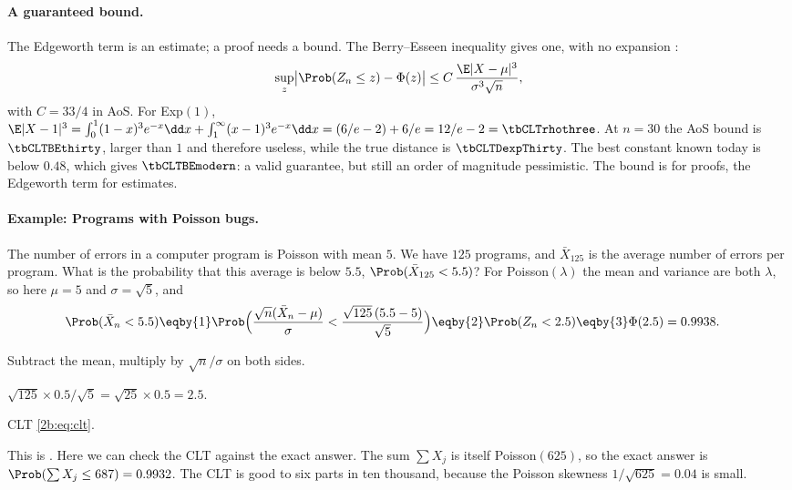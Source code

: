 \paragraph{A guaranteed bound.} The Edgeworth term is an estimate; a proof needs a bound. The Berry--Esseen inequality gives one, with no expansion :
\begin{equation}
  \sup_z\bigl|\Prob(Z_n\le z)-\Phi(z)\bigr|\le C\,\frac{\E|X-\mu|^3}{\sigma^3\sqrt n} ,
  \label{2b:eq:berry-esseen}
\end{equation}
with $C=33/4$ in AoS. For Exp$(1)$, $\E|X-1|^3=\int_0^1(1-x)^3e^{-x}\dd x+\int_1^\infty(x-1)^3e^{-x}\dd x=(6/e-2)+6/e=12/e-2=\tbCLTrhothree$. At $n=30$ the AoS bound is $\tbCLTBEthirty$, larger than $1$ and therefore useless, while the true distance is $\tbCLTDexpThirty$. The best constant known today is below $0.48$, which gives $\tbCLTBEmodern$: a valid guarantee, but still an order of magnitude pessimistic. The bound is for proofs, the Edgeworth term for estimates.

\paragraph{Example: Programs with Poisson bugs.}
\label{2b:ex:aos-poisson}
The number of errors in a computer program is Poisson with mean $5$. We have $125$ programs, and $\bar X_{125}$ is the average number of errors per program. What is the probability that this average is below $5.5$, $\Prob(\bar X_{125}<5.5)$? For Poisson$(\lambda)$ the mean and variance are both $\lambda$, so here $\mu=5$ and $\sigma=\sqrt5$, and
\begin{align*}
  \Prob(\bar X_n<5.5)
  &\eqby{1} \Prob\Bigl(\frac{\sqrt n(\bar X_n-\mu)}{\sigma}<\frac{\sqrt{125}\,(5.5-5)}{\sqrt5}\Bigr)
  \eqby{2} \Prob(Z_n<2.5)
  \eqby{3} \Phi(2.5)=0.9938 .
\end{align*}
\begin{explain}
  \item Subtract the mean, multiply by $\sqrt n/\sigma$ on both sides.
  \item $\sqrt{125}\times0.5/\sqrt5=\sqrt{25}\times0.5=2.5$.
  \item CLT \eqref{2b:eq:clt}.
\end{explain}
This is . Here we can check the CLT against the exact answer. The sum $\sum X_j$ is itself Poisson$(625)$, so the exact answer is $\Prob(\sum X_j\le687)=0.9932$. The CLT is good to six parts in ten thousand, because the Poisson skewness $1/\sqrt{625}=0.04$ is small.

